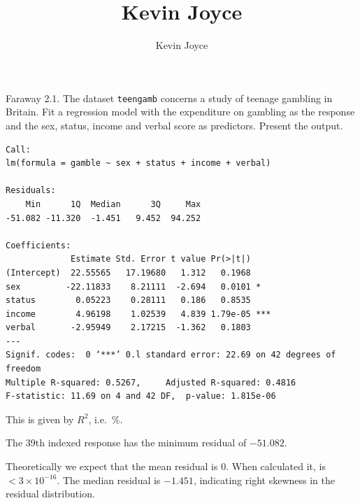 \documentclass{homework}
\title{Kevin Joyce}
\author{Kevin Joyce}
\begin{document}
 
\newcommand{\figref}[1]{\figurename~\ref{#1}}
\renewcommand{\bar}{\overline}
\renewcommand{\hat}{\widehat}
\renewcommand{\SS}{\mathcal S}
\newcommand{\HH}{\mathscr H}
\newcommand{\mom}{\widetilde}
\newcommand{\mle}{\widehat \Uptheta}
\newcommand{\eps}{\varepsilon}
\newcommand{\todist}{\stackrel{D}\longrightarrow}
\newcommand{\toprob}{\stackrel{p}\longrightarrow}
\newcommand{\TTheta}{\overline{\underline \Theta} }
\newcommand{\del}{\partial}
\newcommand{\approxsim}{\overset{\cdotp}{\underset{\cdotp}{\sim}}}
\begin{longproblem}
  Faraway 2.1. The dataset \texttt{teengamb} concerns a study of teenage gambling in Britain.  Fit a regression model with the expenditure on gambling as the response and the sex, status, income and verbal score as predictors.  Present the output.
\begin{verbatim}
Call:
lm(formula = gamble ~ sex + status + income + verbal)

Residuals:
    Min      1Q  Median      3Q     Max 
-51.082 -11.320  -1.451   9.452  94.252 

Coefficients:
             Estimate Std. Error t value Pr(>|t|)    
(Intercept)  22.55565   17.19680   1.312   0.1968    
sex         -22.11833    8.21111  -2.694   0.0101 *  
status        0.05223    0.28111   0.186   0.8535    
income        4.96198    1.02539   4.839 1.79e-05 ***
verbal       -2.95949    2.17215  -1.362   0.1803    
---
Signif. codes:  0 ‘***’ 0.l standard error: 22.69 on 42 degrees of freedom
Multiple R-squared: 0.5267,     Adjusted R-squared: 0.4816 
F-statistic: 11.69 on 4 and 42 DF,  p-value: 1.815e-06 

\end{verbatim}


This is given by $R^2$, i.e.~\unit[53]{\%}.


The 39th indexed response has the minimum residual of $-51.082$. 


Theoretically we expect that the mean residual is $0$.  When calculated it, is $ < 3\times 10^{-16}$. The median residual is  $-1.451$, indicating right skewness in the residual distribution.



\end{longproblem}
\end{document}
